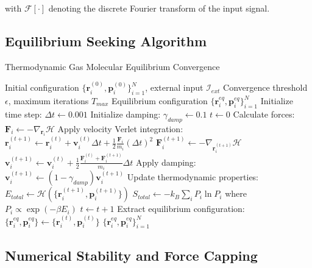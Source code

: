 with $\mathcal{F}[\cdot]$ denoting the discrete Fourier transform of the input signal.

\subsection{Equilibrium Seeking Algorithm}

\begin{algorithm}
\caption{Thermodynamic Gas Molecular Equilibrium Convergence}
\label{alg:equilibrium-seeking}
\begin{algorithmic}[1]
\REQUIRE Initial configuration $\{\mathbf{r}_i^{(0)}, \mathbf{p}_i^{(0)}\}_{i=1}^N$, external input $\mathcal{I}_{ext}$
\REQUIRE Convergence threshold $\epsilon$, maximum iterations $T_{max}$
\ENSURE Equilibrium configuration $\{\mathbf{r}_i^{eq}, \mathbf{p}_i^{eq}\}_{i=1}^N$
\STATE Initialize time step: $\Delta t \leftarrow 0.001$
\STATE Initialize damping: $\gamma_{damp} \leftarrow 0.1$
\STATE $t \leftarrow 0$
        \STATE Calculate forces: $\mathbf{F}_i \leftarrow -\nabla_{\mathbf{r}_i} \mathcal{H}$
        \STATE Apply velocity Verlet integration:
        \STATE $\mathbf{r}_i^{(t+1)} \leftarrow \mathbf{r}_i^{(t)} + \mathbf{v}_i^{(t)} \Delta t + \frac{1}{2} \frac{\mathbf{F}_i}{m_i} (\Delta t)^2$
        \STATE $\mathbf{F}_i^{(t+1)} \leftarrow -\nabla_{\mathbf{r}_i^{(t+1)}} \mathcal{H}$
        \STATE $\mathbf{v}_i^{(t+1)} \leftarrow \mathbf{v}_i^{(t)} + \frac{1}{2} \frac{\mathbf{F}_i^{(t)} + \mathbf{F}_i^{(t+1)}}{m_i} \Delta t$
        \STATE Apply damping: $\mathbf{v}_i^{(t+1)} \leftarrow (1 - \gamma_{damp}) \mathbf{v}_i^{(t+1)}$
    \ENDFOR
    \STATE Update thermodynamic properties:
    \STATE $E_{total} \leftarrow \mathcal{H}(\{\mathbf{r}_i^{(t+1)}, \mathbf{p}_i^{(t+1)}\})$
    \STATE $S_{total} \leftarrow -k_B \sum_i P_i \ln P_i$ where $P_i \propto \exp(-\beta E_i)$
    \STATE $t \leftarrow t + 1$
\ENDWHILE
\STATE Extract equilibrium configuration: $\{\mathbf{r}_i^{eq}, \mathbf{p}_i^{eq}\} \leftarrow \{\mathbf{r}_i^{(t)}, \mathbf{p}_i^{(t)}\}$
\RETURN $\{\mathbf{r}_i^{eq}, \mathbf{p}_i^{eq}\}_{i=1}^N$
\end{algorithmic}
\end{algorithm}

\subsection{Numerical Stability and Force Capping}

